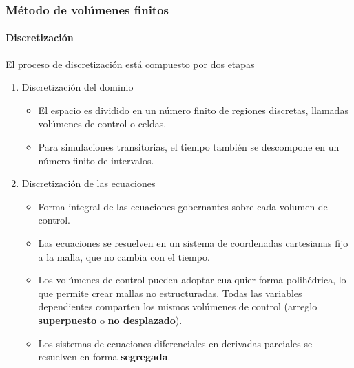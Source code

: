 \begin{frame}
    \frametitle{M\'etodo de vol\'umenes finitos}
    \framesubtitle{Discretizaci\'on}
    
    El proceso de discretizaci\'on est\'a compuesto por dos etapas

        \begin{enumerate}
            \item Discretizaci\'on del dominio
                \begin{itemize}
                    \footnotesize
                    \item El espacio es dividido en un n\'umero finito de regiones discretas, llamadas vol\'umenes de control o celdas.
                    \item Para simulaciones transitorias, el tiempo tambi\'en se descompone en un n\'umero finito de intervalos.
                \end{itemize}                          

            \item Discretizaci\'on de las ecuaciones
                \begin{itemize}
                    \footnotesize
                    \item Forma integral de las ecuaciones gobernantes sobre cada volumen de control.
                    \item Las ecuaciones se resuelven en un sistema de coordenadas cartesianas fijo a la malla, que no cambia con el tiempo.
                    \item Los vol\'umenes de control pueden adoptar cualquier forma polih\'edrica, lo que permite crear mallas no estructuradas. Todas las variables dependientes comparten los mismos vol\'umenes de control (arreglo {\bf superpuesto} o {\bf no desplazado}).
                    \item Los sistemas de ecuaciones diferenciales en derivadas parciales se resuelven en forma {\bf segregada}.
                \end{itemize}                                      
            
        \end{enumerate}                  

\end{frame}











